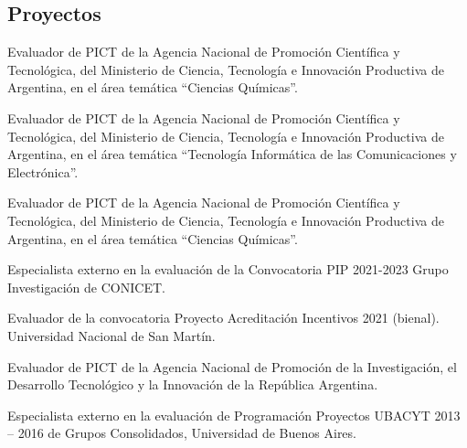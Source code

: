 \subsection{Proyectos}

 Evaluador de PICT de la Agencia Nacional de Promoción Científica y Tecnológica, del Ministerio de Ciencia, Tecnología e 
Innovación Productiva de Argentina, en el área temática ``Ciencias Químicas''.

 Evaluador de PICT de la Agencia Nacional de Promoción Científica y Tecnológica, del Ministerio de Ciencia, Tecnología e 
Innovación Productiva de Argentina, en el área temática ``Tecnología Informática de las Comunicaciones y Electrónica''.

 Evaluador de PICT de la Agencia Nacional de Promoción Científica y Tecnológica, del Ministerio de Ciencia, Tecnología e 
Innovación Productiva de Argentina, en el área temática ``Ciencias Químicas''.

 Especialista externo en la evaluación de la Convocatoria PIP 2021-2023 Grupo Investigación de CONICET.

 Evaluador de la convocatoria Proyecto Acreditación Incentivos 2021 (bienal). Universidad Nacional de San Martín.

 Evaluador de PICT de la Agencia Nacional de Promoción de la Investigación, el Desarrollo Tecnológico y la Innovación de la República Argentina.

 Especialista externo en la evaluación de Programación Proyectos UBACYT 2013 -- 2016 de Grupos Consolidados, Universidad de Buenos Aires.

